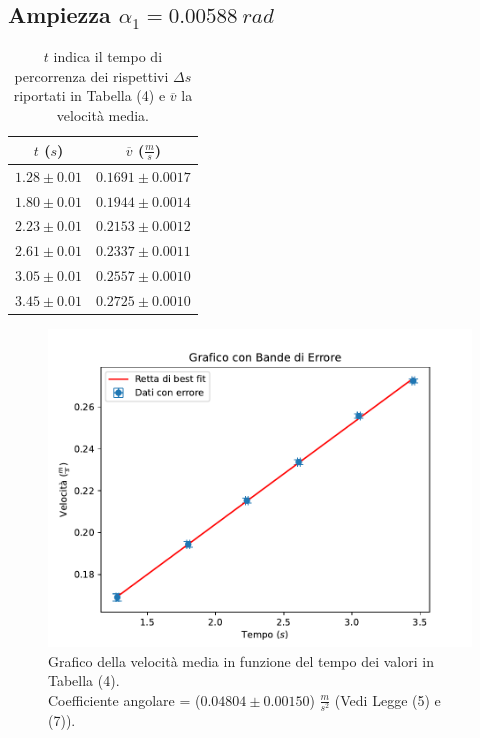 \documentclass[11pt]{article}
\begin{document}
\subsection{Ampiezza $\alpha_1=0.00588\ rad$}
\begin{table}[H]
\centering
\begin{tabular}{|c|c|}
\hline
\textbf{$t$ ($s$)} & \textbf{$\overline{v}$ ($\frac{m}{s}$)} \\
\hline
$1.28\pm 0.01$ & $0.1691\pm 0.0017$ \\
$1.80\pm 0.01$ & $0.1944\pm 0.0014$ \\
$2.23\pm 0.01$ & $0.2153\pm 0.0012$ \\
$2.61\pm 0.01$ & $0.2337\pm 0.0011$ \\
$3.05\pm 0.01$ & $0.2557\pm 0.0010$ \\
$3.45\pm 0.01$ & $0.2725\pm 0.0010$ \\
\hline
\end{tabular}
\caption{$t$ indica il tempo di percorrenza dei rispettivi $\Delta s$ riportati in Tabella (4) e $\overline{v}$ la velocità media.}
\label{tab:}
\end{table}
\begin{figure}[H]
  \centering
  \includegraphics[width=1\textwidth]{grafico1p1.pdf}
  \caption{Grafico della velocità media in funzione del tempo dei valori in Tabella (4). \\
    Coefficiente angolare = ($0.04804\pm 0.00150$) $\frac{m}{s^2}$ (Vedi Legge (5) e (7)).}
\end{figure}
\end{document}
